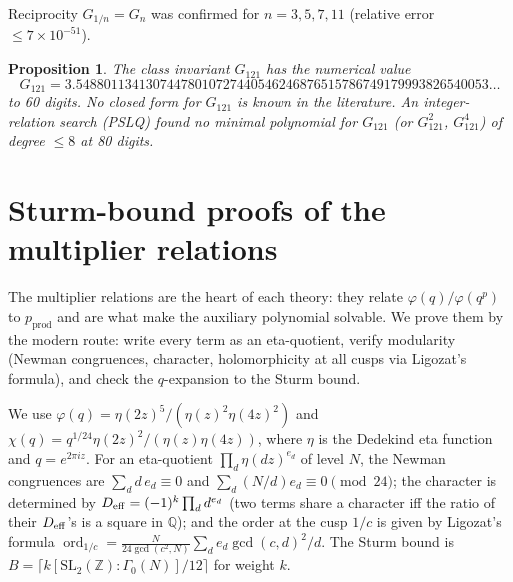 \documentclass[11pt]{amsart}
\theoremstyle{plain}
\newtheorem{proposition}[theorem]{Proposition}
\theoremstyle{definition}
\theoremstyle{remark}
\newcommand{\Z}{\mathbb{Z}}
\newcommand{\Q}{\mathbb{Q}}
\newcommand{\pprod}{p_{\mathrm{prod}}}
\begin{document}
Reciprocity $G_{1/n} = G_n$ was confirmed for $n=3,5,7,11$ (relative error
$\leq 7\times 10^{-51}$).

\begin{proposition}
The class invariant $G_{121}$ has the numerical value
\begin{equation}
G_{121} = 3.54880113413074478010727440546246876515786749179993826540053\dots
\end{equation}
to 60 digits. No closed form for $G_{121}$ is known in the literature. An integer-relation
search (PSLQ) found no minimal polynomial for $G_{121}$ (or $G_{121}^2$, $G_{121}^4$)
of degree $\leq 8$ at 80 digits.
\end{proposition}

\section{Sturm-bound proofs of the multiplier relations}
\label{sec:sturm}

The multiplier relations are the heart of each theory: they relate
$\varphi(q)/\varphi(q^p)$ to $\pprod$ and are what make the auxiliary polynomial
solvable. We prove them by the modern route: write every term as an eta-quotient,
verify modularity (Newman congruences, character, holomorphicity at all cusps via
Ligozat's formula), and check the $q$-expansion to the Sturm bound.

We use $\varphi(q) = \eta(2z)^5/(\eta(z)^2\eta(4z)^2)$ and
$\chi(q) = q^{1/24}\eta(2z)^2/(\eta(z)\eta(4z))$, where $\eta$ is the Dedekind eta
function and $q = e^{2\pi i z}$. For an eta-quotient $\prod_d \eta(dz)^{e_d}$ of
level $N$, the Newman congruences are $\sum_d d\,e_d \equiv 0$ and
$\sum_d (N/d)e_d \equiv 0 \pmod{24}$; the character is determined by
$D_{\rm eff} = (-1)^k\prod_d d^{e_d}$ (two terms share a character iff the ratio of
their $D_{\rm eff}$'s is a square in $\Q$); and the order at the cusp $1/c$ is given
by Ligozat's formula
$\operatorname{ord}_{1/c} = \frac{N}{24\gcd(c^2,N)}\sum_d e_d\gcd(c,d)^2/d$.
The Sturm bound is $B = \lceil k[\mathrm{SL}_2(\Z):\Gamma_0(N)]/12\rceil$ for weight $k$.
\end{document}

